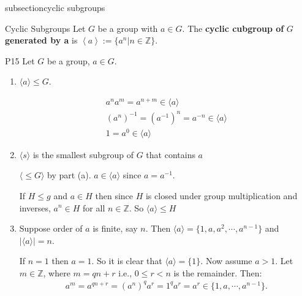 \documentclass{article}
\begin{document}


subsection{cyclic subgroups}

\begin{cdef}{Cyclic Subgroups}{}
    Let $G$ be a group with $a \in G$. The \textbf{cyclic cubgroup of } $G$ \textbf{ generated by a} is $\left< a \right> := \{ a^n | n \in \mathbb{Z} \}$. 
\end{cdef}

\begin{cprop}{P15}{}
    Let $G$ be a group, $a \in G$. 
    \begin{enumerate}
        \item $\langle a \rangle \leq G$. 
            \begin{cpf}
                \begin{align*}
                    a^{n}a^{m} = a^{n+m} \in \langle a \rangle \\
                    \left( a^{n} \right)^{-1} = \left( a^{-1} \right)^{n} = a^{-n} \in \langle a \rangle\\
                    1 = a^{0} \in \langle a \rangle 
                \end{align*}
            \end{cpf}
        \item $ \langle s \rangle$ is the smallest subgroup of $G$ that contains $a$
            \begin{cpf}
                
                $ \langle  \leq G \rangle$ by part (a). $a \in \langle a \rangle$ since $a = a^{-1}$. 

                If $H \leq g$ and $a \in H$ then since $H$ is closed under group multiplication and inverses, $a^{n} \in H$ for all $n \in \mathbb{Z}$. So  $ \langle a \rangle \leq H$
            \end{cpf}
        \item Suppose order of $a$ is finite, say $n$. Then $ \langle a \rangle = \{ 1, a, a^2, \cdots, a^{n-1} \}$ and $| \langle a \rangle| = n$. 
            \begin{cpf}
                If $n=1$ then $a = 1$. So it is clear that $ \langle a \rangle = \{ 1 \}$. Now assume $a > 1$. Let $m \in \mathbb{Z}$, where $m = qn + r$ i.e., $0 \leq r < n$ is the remainder. Then:
                \begin{align*}
                    a^{m} = a^{qn+r} = \left( a^{n} \right)^{q}a^{r} = 1^{q}a^{r} = a^{r} \in \{ 1, a, \cdots, a^{n-1} \}. 
                \end{align*}


\end{cpf}
\end{enumerate}
\end{cprop}
\end{document}
